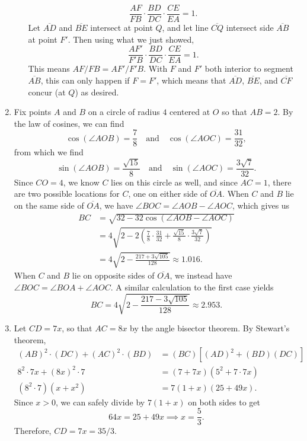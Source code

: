 \begin{enumerate}
\begin{enumerate}
\begin{equation*}
\frac{AF}{FB}\cdot\frac{BD}{DC}\cdot\frac{CE}{EA} = 1.
\end{equation*}
Let $\overline{AD}$ and $\overline{BE}$ intersect at point $Q$, and let line $\overline{CQ}$ intersect side $\overline{AB}$ at point $F'$. Then using what we just showed,
\begin{equation*}
\frac{AF'}{F'B}\cdot\frac{BD}{DC}\cdot\frac{CE}{EA} = 1.
\end{equation*}
This means $AF/FB = AF'/F'B$. With $F$ and $F'$ both interior to segment $\overline{AB}$, this can only happen if $F = F'$, which means that $\overline{AD}$, $\overline{BE}$, and $\overline{CF}$ concur (at $Q$) as desired.
\end{enumerate}
\item Fix points $A$ and $B$ on a circle of radius $4$ centered at $O$ so that $AB = 2$. By the law of cosines, we can find
\begin{equation*}
\cos(\angle AOB) = \frac{7}{8}\quad\text{and}\quad\cos(\angle AOC) = \frac{31}{32},
\end{equation*}
from which we find
\begin{equation*}
\sin(\angle AOB) = \frac{\sqrt{15}}{8}\quad\text{and}\quad\sin(\angle AOC) = \frac{3\sqrt{7}}{32}.
\end{equation*}
Since $CO = 4$, we know $C$ lies on this circle as well, and since $AC = 1$, there are two possible locations for $C$, one on either side of $\overline{OA}$. When $C$ and $B$ lie on the same side of $\overline{OA}$, we have $\angle BOC = \angle AOB - \angle AOC$, which gives us
\begin{align*}
BC &= \sqrt{32 - 32\cos(\angle AOB - \angle AOC)} \\
&= 4\sqrt{2 - 2\left(\frac{7}{8}\cdot\frac{31}{32} + \frac{\sqrt{15}}{8}\cdot\frac{3\sqrt{7}}{32}\right)} \\
&= 4\sqrt{2 - \frac{217 + 3\sqrt{105}}{128}}\approx 1.016.
\end{align*}
When $C$ and $B$ lie on opposite sides of $\overline{OA}$, we instead have $\angle BOC = \angle BOA + \angle AOC$. A similar calculation to the first case yields
\begin{equation*}
BC = 4\sqrt{2 - \frac{217 - 3\sqrt{105}}{128}}\approx 2.953.
\end{equation*}
\item Let $CD = 7x$, so that $AC = 8x$ by the angle bisector theorem. By Stewart's theorem,
\begin{align*}
(AB)^2\cdot (DC) + (AC)^2\cdot (BD) &= (BC)[(AD)^2 + (BD)(DC)] \\
8^2\cdot 7x + (8x)^2\cdot 7 &= (7 + 7x)(5^2 + 7\cdot 7x) \\
(8^2\cdot 7)(x + x^2) &= 7(1 + x)(25 + 49x).
\end{align*}
Since $x > 0$, we can safely divide by $7(1 + x)$ on both sides to get
\begin{equation*}
64x = 25 + 49x\implies x = \frac{5}{3}.
\end{equation*}
Therefore, $CD = 7x = 35/3$.





\end{enumerate}

